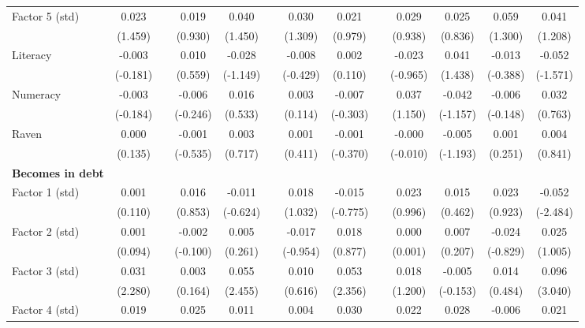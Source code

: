 \begin{table}[htbp]
{\begin{tabular}{lcccccccccccc}
    Factor 5 (std) & 0.023 &       & 0.019 & 0.040 &       & 0.030 & 0.021 &       & 0.029 & 0.025 & 0.059 & 0.041 \\
          & (1.459) &       & (0.930) & (1.450) &       & (1.309) & (0.979) &       & (0.938) & (0.836) & (1.300) & (1.208) \\
    Literacy & -0.003 &       & 0.010 & -0.028 &       & -0.008 & 0.002 &       & -0.023 & 0.041 & -0.013 & -0.052 \\
          & (-0.181) &       & (0.559) & (-1.149) &       & (-0.429) & (0.110) &       & (-0.965) & (1.438) & (-0.388) & (-1.571) \\
    Numeracy & -0.003 &       & -0.006 & 0.016 &       & 0.003 & -0.007 &       & 0.037 & -0.042 & -0.006 & 0.032 \\
          & (-0.184) &       & (-0.246) & (0.533) &       & (0.114) & (-0.303) &       & (1.150) & (-1.157) & (-0.148) & (0.763) \\
    Raven & 0.000 &       & -0.001 & 0.003 &       & 0.001 & -0.001 &       & -0.000 & -0.005 & 0.001 & 0.004 \\
          & (0.135) &       & (-0.535) & (0.717) &       & (0.411) & (-0.370) &       & (-0.010) & (-1.193) & (0.251) & (0.841) \\
    \midrule
    \textbf{Becomes in debt} &       &       &       &       &       &       &       &       &       &       &       &  \\
    Factor 1 (std) & 0.001 &       & 0.016 & -0.011 &       & 0.018 & -0.015 &       & 0.023 & 0.015 & 0.023 & -0.052 \\
          & (0.110) &       & (0.853) & (-0.624) &       & (1.032) & (-0.775) &       & (0.996) & (0.462) & (0.923) & (-2.484) \\
    Factor 2 (std) & 0.001 &       & -0.002 & 0.005 &       & -0.017 & 0.018 &       & 0.000 & 0.007 & -0.024 & 0.025 \\
          & (0.094) &       & (-0.100) & (0.261) &       & (-0.954) & (0.877) &       & (0.001) & (0.207) & (-0.829) & (1.005) \\
    Factor 3 (std) & 0.031 &       & 0.003 & 0.055 &       & 0.010 & 0.053 &       & 0.018 & -0.005 & 0.014 & 0.096 \\
          & (2.280) &       & (0.164) & (2.455) &       & (0.616) & (2.356) &       & (1.200) & (-0.153) & (0.484) & (3.040) \\
    Factor 4 (std) & 0.019 &       & 0.025 & 0.011 &       & 0.004 & 0.030 &       & 0.022 & 0.028 & -0.006 & 0.021 \\

\end{tabular}}
\end{table}
